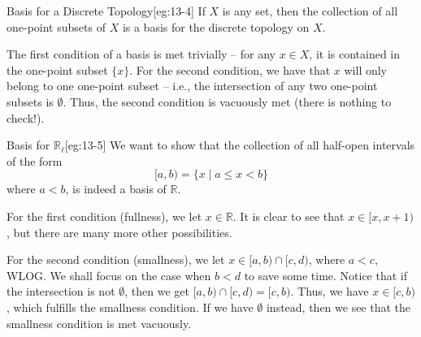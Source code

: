 \begin{egBox}{Basis for a Discrete Topology}[eg:13-4]
    If \( X \) is any set, then the collection of all one-point subsets of 
    \( X \) is a basis for the discrete topology on \( X \).

    \baseSkip 

    The first condition of a basis is met trivially -- for any \( x \in X \),
    it is contained in the one-point subset \( \{ x \} \). 
    For the second condition, we have that \( x \) will only belong to one 
    one-point subset -- i.e., the intersection of any two one-point subsets 
    is \( \emptyset \). Thus, the second condition is vacuously met (there is 
    nothing to check!).
\end{egBox}

\begin{egBox}{Basis for \( \mathbb{R}_{ \ell } \)}[eg:13-5]
    We want to show that the collection of all half-open intervals of the 
    form 
    \begin{equation*}
        [ a, b )
        =
        \{ x \mid a \leq x < b \}
    \end{equation*} 
    where \( a < b \), is indeed a basis of \( \mathbb{R} \).

    \baseSkip

    For the first condition (fullness), we let \( x \in \mathbb{R} \). 
    It is clear to see that \( x \in [ x, x + 1 ) \), but there are many more 
    other possibilities.

    \baseSkip 

    For the second condition (smallness), we let 
    \( x \in [ a, b ) \cap [ c, d ) \), where \( a < c \), WLOG.
    We shall focus on the case when \( b < d \) to save some time.
    Notice that if the intersection is not \( \emptyset \), then we get 
    \( [ a, b ) \cap [ c, d ) = [ c, b ) \).
    Thus, we have \( x \in [ c, b ) \), which fulfills the smallness condition. 
    If we have \( \emptyset \) instead, then we see that the smallness 
    condition is met vacuously.
\end{egBox}

